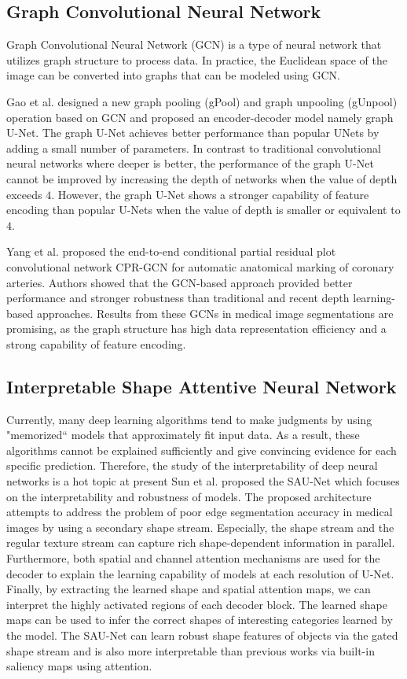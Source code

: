 \subsection{Graph Convolutional Neural Network}
Graph Convolutional Neural Network (GCN) is a type of neural network that
utilizes graph structure to process data. In practice, the Euclidean space of
the image can be converted into graphs that can be modeled using GCN.

Gao et al. \cite{gao2019graph} designed a new graph pooling (gPool) and graph
unpooling (gUnpool) operation based on GCN and proposed an encoder-decoder model
namely graph U-Net. The graph U-Net achieves better performance than popular
UNets by adding a small number of parameters. In contrast to traditional
convolutional neural networks where deeper is better, the performance of the
graph U-Net cannot be improved by increasing the depth of networks when the
value of depth exceeds $4$. However, the graph U-Net shows a stronger capability
of feature encoding than popular U-Nets when the value of depth is smaller or
equivalent to $4$.

Yang et al. \cite{yang2020cpr} proposed the end-to-end conditional partial
residual plot convolutional network CPR-GCN for automatic anatomical marking of
coronary arteries. Authors showed that the GCN-based approach provided better
performance and stronger robustness than traditional and recent depth
learning-based approaches. Results from these GCNs in medical image
segmentations are promising, as the graph structure has high data representation
efficiency and a strong capability of feature encoding.

\subsection{Interpretable Shape Attentive Neural Network}
Currently, many deep learning algorithms tend to make judgments by using
"memorized`` models that approximately fit input data. As a result, these
algorithms cannot be explained sufficiently and give convincing evidence for
each specific prediction. Therefore, the study of the interpretability of deep
neural networks is a hot topic at present
Sun et al. \cite{sun2020saunet} proposed the SAU-Net which focuses on the
interpretability and robustness of models. The proposed architecture attempts to
address the problem of poor edge segmentation accuracy in medical images by
using a secondary shape stream. Especially, the shape stream and the regular
texture stream can capture rich shape-dependent information in parallel.
Furthermore, both spatial and channel attention mechanisms are used for the
decoder to explain the learning capability of models at each resolution of
U-Net. Finally, by extracting the learned shape and spatial attention maps, we
can interpret the highly activated regions of each decoder block. The learned
shape maps can be used to infer the correct shapes of interesting categories
learned by the model. The SAU-Net can learn robust shape features of objects via
the gated shape stream and is also more interpretable than previous works via
built-in saliency maps using attention.

